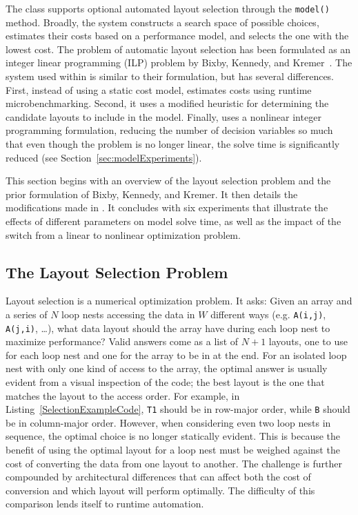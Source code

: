 The \FormatDecisions{} class supports optional automated layout selection through the \verb.model(). method.
Broadly, the system constructs a search space of possible choices, estimates their costs based on a performance model, and selects the one with the lowest cost.
The problem of automatic layout selection has been formulated as an integer linear programming (ILP) problem by Bixby, Kennedy, and Kremer~\cite{bixby1994automatic}.
The system used within \FormatDecisions{} is similar to their formulation, but has several differences.
First, instead of using a static cost model, \FormatDecisions{} estimates costs using runtime microbenchmarking.
Second, it uses a modified heuristic for determining the candidate layouts to include in the model.
Finally, \FormatDecisions{} uses a nonlinear integer programming formulation, reducing the number of decision variables so much that even though the problem is no longer linear, the solve time is significantly reduced (see Section~\ref{sec:modelExperiments}).

This section begins with an overview of the layout selection problem and the prior formulation of Bixby, Kennedy, and Kremer.
It then details the modifications made in \FormatDecisions{}.
It concludes with six experiments that illustrate the effects of different parameters on model solve time, as well as the impact of the switch from a linear to nonlinear optimization problem.

\subsection{The Layout Selection Problem}

Layout selection is a numerical optimization problem.
It asks: Given an array and a series of $N$ loop nests accessing the data in $W$ different ways (e.g. \verb.A(i,j)., \verb.A(j,i)., \dots), what data layout should the array have during each loop nest to maximize performance?
Valid answers come as a list of $N+1$ layouts, one to use for each loop nest and one for the array to be in at the end.
For an isolated loop nest with only one kind of access to the array, the optimal answer is usually evident from a visual inspection of the code; the best layout is the one that matches the layout to the access order.
For example, in Listing~\ref{SelectionExampleCode}, \verb.T1. should be in row-major order, while \verb.B. should be in column-major order. 
However, when considering even two loop nests in sequence, the optimal choice is no longer statically evident.
This is because the benefit of using the optimal layout for a loop nest must be weighed against the cost of converting the data from one layout to another.
The challenge is further compounded by architectural differences that can affect both the cost of conversion and which layout will perform optimally.
The difficulty of this comparison lends itself to runtime automation.

